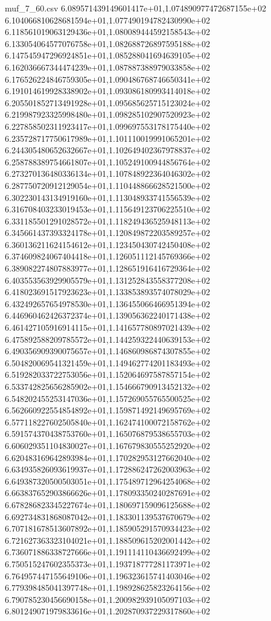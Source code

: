 \begin{filecontents*}{muf_7_60.csv}
6.089571439149601417e+01,1.074890977472687155e+02
6.104066810628681594e+01,1.077490194782430990e+02
6.118561019063129436e+01,1.080089444592158543e+02
6.133054064577076758e+01,1.082688726897595188e+02
6.147545947296924851e+01,1.085288041694639105e+02
6.162036667344474239e+01,1.087887388979033858e+02
6.176526224846759305e+01,1.090486768746650341e+02
6.191014619928338902e+01,1.093086180993414018e+02
6.205501852713491928e+01,1.095685625715123024e+02
6.219987923325998480e+01,1.098285102907520923e+02
6.227858502311923417e+01,1.099697553178175440e+02
6.235728717750617989e+01,1.101110019991065201e+02
6.244305480652632667e+01,1.102649402367978837e+02
6.258788389754661807e+01,1.105249100944856764e+02
6.273270136480336134e+01,1.107848922364046302e+02
6.287750720912129054e+01,1.110448866628521500e+02
6.302230143134919160e+01,1.113048933741556539e+02
6.316708403233019453e+01,1.115649123706225510e+02
6.331185501291028572e+01,1.118249436525948113e+02
6.345661437393324178e+01,1.120849872203589257e+02
6.360136211624154612e+01,1.123450430742450408e+02
6.374609824067404418e+01,1.126051112145769366e+02
6.389082274807883977e+01,1.128651916416729364e+02
6.403553563929905579e+01,1.131252843558377208e+02
6.418023691517923623e+01,1.133853893574078029e+02
6.432492657654978530e+01,1.136455066466951394e+02
6.446960462426372374e+01,1.139056362240171438e+02
6.461427105916914115e+01,1.141657780897021439e+02
6.475892588209785572e+01,1.144259322440639153e+02
6.490356909390075657e+01,1.146860986874307855e+02
6.504820069541321459e+01,1.149462774201183493e+02
6.519282033722753056e+01,1.152064697587857154e+02
6.533742825656285902e+01,1.154666790913452132e+02
6.548202455253147036e+01,1.157269055765500525e+02
6.562660922554854892e+01,1.159871492149695769e+02
6.577118227602505840e+01,1.162474100072158762e+02
6.591574370438753760e+01,1.165076879538655703e+02
6.606029351104830027e+01,1.167679830555252920e+02
6.620483169642893984e+01,1.170282953127662040e+02
6.634935826093619937e+01,1.172886247262003963e+02
6.649387320500503051e+01,1.175489712964254068e+02
6.663837652903866626e+01,1.178093350240287691e+02
6.678286823345227674e+01,1.180697159096125688e+02
6.692734831868087042e+01,1.183301139537670679e+02
6.707181678513607892e+01,1.185905291570934423e+02
6.721627363323104021e+01,1.188509615202001442e+02
6.736071886338727666e+01,1.191114110436692499e+02
6.750515247602355373e+01,1.193718777281173971e+02
6.764957447155649106e+01,1.196323615741403046e+02
6.779398485041397748e+01,1.198928625823264156e+02
6.790785230456690158e+01,1.200982939105097103e+02
6.801249071979833616e+01,1.202870937229317860e+02

\end{filecontents*}
